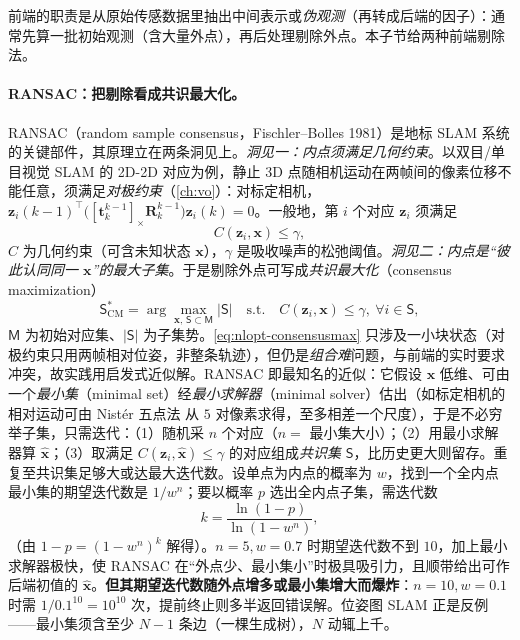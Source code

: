 前端的职责是从原始传感数据里抽出中间表示或\emph{伪观测}（再转成后端的因子）：通常先算一批初始观测（含大量外点），再后处理剔除外点\cite{carlone2026handbook}。本子节给两种前端剔除法。

\paragraph{RANSAC：把剔除看成共识最大化。}\cite{fischler1981ransac,carlone2026handbook}
RANSAC（random sample consensus，Fischler--Bolles 1981）是地标 SLAM 系统的关键部件，其原理立在两条洞见上。\emph{洞见一：内点须满足几何约束}。以双目/单目视觉 SLAM 的 2D-2D 对应为例，静止 3D 点随相机运动在两帧间的像素位移不能任意，须满足\emph{对极约束}（\cref{ch:vo}）：对标定相机，$\mathbf{z}_i(k{-}1)^\top\big([\mathbf{t}_k^{k-1}]_\times\mathbf{R}_k^{k-1}\big)\mathbf{z}_i(k)=0$。一般地，第 $i$ 个对应 $\mathbf{z}_i$ 须满足
\begin{equation}
  C(\mathbf{z}_i,\mathbf{x})\le\gamma,
  \label{eq:nlopt-geomconstraint}
\end{equation}
$C$ 为几何约束（可含未知状态 $\mathbf{x}$），$\gamma$ 是吸收噪声的松弛阈值。\emph{洞见二：内点是“彼此认同同一 $\mathbf{x}$”的最大子集}。于是剔除外点可写成\emph{共识最大化}（consensus maximization）
\begin{equation}
  \mathsf{S}^*_{\mathrm{CM}}=\arg\max_{\mathbf{x},\,\mathsf{S}\subset\mathsf{M}}|\mathsf{S}|
  \quad\text{s.t.}\quad C(\mathbf{z}_i,\mathbf{x})\le\gamma,\ \forall i\in\mathsf{S},
  \label{eq:nlopt-consensusmax}
\end{equation}
$\mathsf{M}$ 为初始对应集、$|\mathsf{S}|$ 为子集势。\cref{eq:nlopt-consensusmax} 只涉及一小块状态（对极约束只用两帧相对位姿，非整条轨迹），但仍是\emph{组合难}问题，与前端的实时要求冲突，故实践用启发式近似解。RANSAC 即最知名的近似：它假设 $\mathbf{x}$ 低维、可由一个\emph{最小集}（minimal set）经\emph{最小求解器}（minimal solver）估出（如标定相机的相对运动可由 Nistér 五点法\cite{nister2004fivepoint} 从 $5$ 对像素求得，至多相差一个尺度），于是不必穷举子集，只需迭代：（1）随机采 $n$ 个对应（$n=$ 最小集大小）；（2）用最小求解器算 $\hat{\mathbf{x}}$；（3）取满足 $C(\mathbf{z}_i,\hat{\mathbf{x}})\le\gamma$ 的对应组成\emph{共识集} $\mathsf{S}$，比历史更大则留存。重复至共识集足够大或达最大迭代数。设单点为内点的概率为 $w$，找到一个全内点最小集的期望迭代数是 $1/w^n$；要以概率 $p$ 选出全内点子集，需迭代数
\begin{equation}
  k=\frac{\ln(1-p)}{\ln(1-w^n)},
  \label{eq:nlopt-ransac}
\end{equation}
（由 $1-p=(1-w^n)^k$ 解得）。$n{=}5,w{=}0.7$ 时期望迭代数不到 $10$，加上最小求解器极快，使 RANSAC 在“外点少、最小集小”时极具吸引力，且顺带给出可作后端初值的 $\hat{\mathbf{x}}$。\textbf{但其期望迭代数随外点增多或最小集增大而爆炸}：$n{=}10,w{=}0.1$ 时需 $1/0.1^{10}=10^{10}$ 次，提前终止则多半返回错误解。位姿图 SLAM 正是反例——最小集须含至少 $N{-}1$ 条边（一棵生成树），$N$ 动辄上千。

